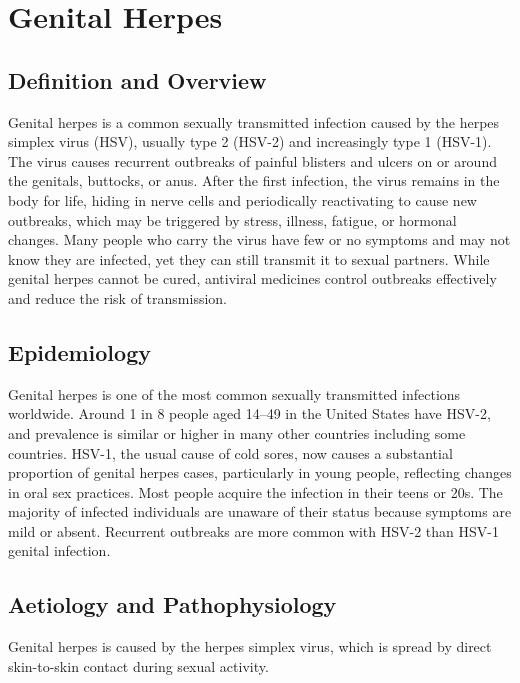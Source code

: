 \chapter{Genital Herpes}

\section*{Definition and Overview}
Genital herpes is a common sexually transmitted infection caused by the herpes simplex virus (HSV), usually type 2 (HSV-2) and increasingly type 1 (HSV-1). The virus causes recurrent outbreaks of painful blisters and ulcers on or around the genitals, buttocks, or anus. After the first infection, the virus remains in the body for life, hiding in nerve cells and periodically reactivating to cause new outbreaks, which may be triggered by stress, illness, fatigue, or hormonal changes. Many people who carry the virus have few or no symptoms and may not know they are infected, yet they can still transmit it to sexual partners. While genital herpes cannot be cured, antiviral medicines control outbreaks effectively and reduce the risk of transmission.

\section*{Epidemiology}
Genital herpes is one of the most common sexually transmitted infections worldwide. Around 1 in 8 people aged 14--49 in the United States have HSV-2, and prevalence is similar or higher in many other countries including some countries. HSV-1, the usual cause of cold sores, now causes a substantial proportion of genital herpes cases, particularly in young people, reflecting changes in oral sex practices. Most people acquire the infection in their teens or 20s. The majority of infected individuals are unaware of their status because symptoms are mild or absent. Recurrent outbreaks are more common with HSV-2 than HSV-1 genital infection.

\section*{Aetiology and Pathophysiology}
Genital herpes is caused by the herpes simplex virus, which is spread by direct skin-to-skin contact during sexual activity.

